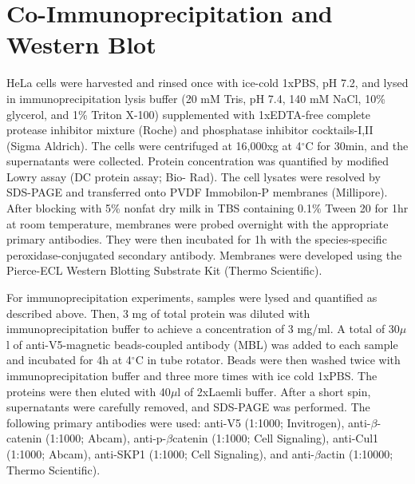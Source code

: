 \documentclass[12pt,chapterheads,final]{ucsd}
\begin{document}
\section{Co-Immunoprecipitation and Western Blot}
HeLa cells were harvested and rinsed once with ice-cold 1xPBS, pH 7.2, and lysed in immunoprecipitation lysis buffer (20 mM Tris, pH 7.4, 140 mM NaCl, 10\% glycerol, and 1\% Triton X-100) supplemented with 1xEDTA-free complete protease inhibitor mixture (Roche) and phosphatase inhibitor cocktails-I,II (Sigma Aldrich). The cells were centrifuged at 16,000xg at 4$^{\circ}$C for 30min, and the supernatants were collected. Protein concentration was quantified by modified Lowry assay (DC protein assay; Bio- Rad). The cell lysates were resolved by SDS-PAGE and transferred onto PVDF Immobilon-P membranes (Millipore). After blocking with 5\% nonfat dry milk in TBS containing 0.1\% Tween 20 for 1hr at room temperature, membranes were probed overnight with the appropriate primary antibodies. They were then incubated for 1h with the species-specific peroxidase-conjugated secondary antibody. Membranes were developed using the Pierce-ECL Western Blotting Substrate Kit (Thermo Scientific). \par
For immunoprecipitation experiments, samples were lysed and quantified as described above. Then, 3 mg of total protein was diluted with immunoprecipitation buffer to achieve a concentration of 3 mg/ml. A total of 30$\mu$l of anti-V5-magnetic beads-coupled antibody (MBL) was added to each sample and incubated for 4h at 4$^{\circ}$C in tube rotator. Beads were then washed twice with immunoprecipitation buffer and three more times with ice cold 1xPBS. The proteins were then eluted with 40$\mu$l of 2xLaemli buffer. After a short spin, supernatants were carefully removed, and SDS-PAGE was performed. The following primary antibodies were used: anti-V5 (1:1000; Invitrogen), anti-$\beta$-catenin (1:1000; Abcam), anti-p-$\beta$catenin (1:1000; Cell Signaling), anti-Cul1 (1:1000; Abcam), anti-SKP1 (1:1000; Cell Signaling), and anti-$\beta$actin (1:10000; Thermo Scientific).\par

\appendix
\end{document}
